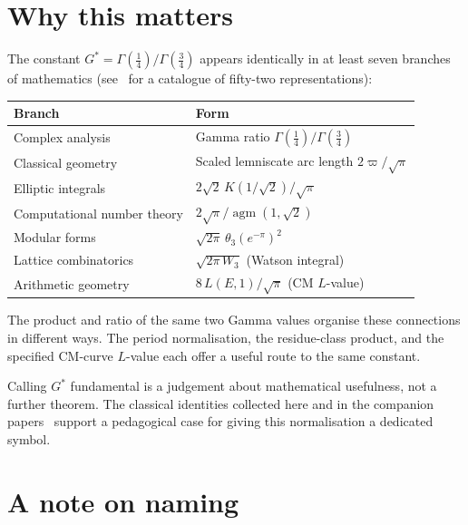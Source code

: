 \documentclass[12pt,reqno]{amsart}
\theoremstyle{definition}
\theoremstyle{remark}
\newcommand{\Gstar}{G^{\!*}}
\newcommand{\varpiup}{\varpi}
\newcommand{\agm}{\operatorname{agm}}
\begin{document}
\section{Why this matters}

The constant $\Gstar = \Gamma(\tfrac14)/\Gamma(\tfrac34)$ appears
identically in at least seven branches of mathematics (see~\cite{Paper2}
for a catalogue of fifty-two representations):
\begin{center}
\begin{tabular}{ll}
\toprule
\textbf{Branch} & \textbf{Form} \\
\midrule
Complex analysis & Gamma ratio $\Gamma(\tfrac14)/\Gamma(\tfrac34)$ \\
Classical geometry & Scaled lemniscate arc length $2\varpiup/\sqrt{\pi}$ \\
Elliptic integrals & $2\sqrt{2}\,K(1/\!\sqrt{2})/\sqrt{\pi}$ \\
Computational number theory & $2\sqrt{\pi}/\agm(1,\sqrt{2})$ \\
Modular forms & $\sqrt{2\pi}\,\theta_{3}(e^{-\pi})^{2}$ \\
Lattice combinatorics & $\sqrt{2\pi\,W_{3}}$ (Watson integral) \\
Arithmetic geometry & $8\,L(E,1)/\sqrt{\pi}$ (CM $L$-value) \\
\bottomrule
\end{tabular}
\end{center}

The product and ratio of the same two Gamma values organise these
connections in different ways. The period normalisation, the
residue-class product, and the specified CM-curve $L$-value each
offer a useful route to the same constant.

Calling $\Gstar$ fundamental is a judgement about mathematical
usefulness, not a further theorem. The classical identities collected
here and in the companion papers~\cite{Paper2,Paper3} support a
pedagogical case for giving this normalisation a dedicated symbol.


\section{A note on naming}
\end{document}
